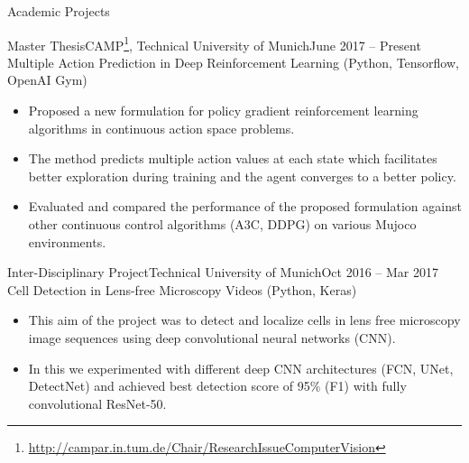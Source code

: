 \documentclass[]{mcdowellcv}
\begin{document}
	\makeheader
	
	\begin{cvsection}{Academic Projects}
	\begin{cvsubsection}[2]{Master Thesis}{CAMP\footnote{\href{http://campar.in.tum.de/Chair/ResearchIssueComputerVision}{http://campar.in.tum.de/Chair/ResearchIssueComputerVision}}, Technical University of Munich}{June 2017 -- Present}
    Multiple Action Prediction in Deep Reinforcement Learning (Python, Tensorflow, OpenAI Gym) \cite{anonymous2018predicting}
        \begin{itemize}
	        \item Proposed a new formulation for policy gradient reinforcement learning algorithms in continuous action space problems.
	        \item The method predicts multiple action values at each state which facilitates better exploration during training and the agent converges to a better policy.
	        \item Evaluated and compared the performance of the proposed formulation against other continuous control algorithms (A3C, DDPG) on various Mujoco environments.
	    \end{itemize}
	\end{cvsubsection}
	
	\begin{cvsubsection}{Inter-Disciplinary Project}{Technical University of Munich}{Oct 2016 -- Mar 2017}
	Cell Detection in Lens-free Microscopy Videos (Python, Keras) \cite{rempfler-2017}
    	\begin{itemize}
    	\item This aim of the project was to detect and localize cells in lens free microscopy image sequences using deep convolutional neural networks (CNN).
        \item In this we experimented with different deep CNN architectures (FCN, UNet, DetectNet) and achieved best detection score of 95\% (F1) with fully convolutional ResNet-50.
    	\end{itemize}
	\end{cvsubsection}
	
	\end{cvsection}
	
\end{document}
